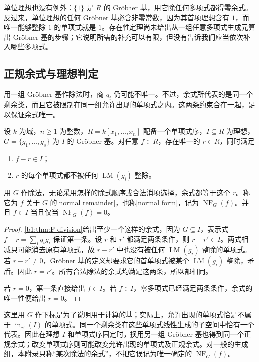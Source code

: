 单位理想也没有例外：\(\{1\}\) 是 \(R\) 的 Gröbner 基，用它除任何多项式都得零余式。反过来，单位理想的任何 Gröbner 基必含非零常数，因为其首项理想含有 \(1\)，而唯一能够整除 \(1\) 的单项式就是 \(1\)。存在性定理尚未给出从一组任意多项式生成元算出 Gröbner 基的步骤；它说明所需的补充可以有限，但没有告诉我们应当依次补入哪些多项式。

\subsection{正规余式与理想判定}
\label{b1:subsec:F02:03}

用一组 Gröbner 基作除法时，商 \(q_i\) 仍可能不唯一。不过，余式所代表的是同一个剩余类，而且它被限制在同一组允许出现的单项式之内。这两条约束合在一起，足以保证余式唯一。

\begin{theorem}[正规式与成员判据]\label{b1:thm:F-normal-form}
	设 \(k\) 为域，\(n\geq1\) 为整数，\(R=k[x_1,\ldots,x_n]\) 配备一个单项式序，\(I\subseteq R\) 为理想，\(G=\{g_1,\ldots,g_s\}\) 为 \(I\) 的 Gröbner 基。对任意 \(f\in R\)，存在唯一的 \(r\in R\)，同时满足
	\begin{enumerate}
		\item \(f-r\in I\)；
		\item \(r\) 的每个单项式都不被任何 \(\operatorname{LM}(g_i)\) 整除。
	\end{enumerate}
	用 \(G\) 作除法，无论采用怎样的除式顺序或合法消项选择，余式都等于这个 \(r\)。称它为 \(f\) 关于 \(G\) 的[normal remainder]，也称[normal form]，记为 \(\operatorname{NF}_G(f)\)。并且 \(f\in I\) 当且仅当 \(\operatorname{NF}_G(f)=0\)。
\end{theorem}
\begin{proof}
	\cref{b1:thm:F-division}给出至少一个这样的余式，因为 \(G\subseteq I\)，表示式 \(f- r=\sum_iq_i g_i\) 保证第一条。设 \(r\) 和 \(r'\) 都满足两条条件，则 \(r-r'\in I\)。两式相减只可能消去原有单项式，故 \(r-r'\) 中也没有被任何 \(\operatorname{LM}(g_i)\) 整除的单项式。若 \(r-r'\ne0\)，Gröbner 基的定义却要求它的首单项式被某个 \(\operatorname{LM}(g_i)\) 整除，矛盾。因此 \(r=r'\)。所有合法除法的余式均满足这两条，所以都相同。

	若 \(r=0\)，第一条直接给出 \(f\in I\)。若 \(f\in I\)，零多项式已经满足两条条件，余式的唯一性便给出 \(r=0\)。
\end{proof}

这里用 \(G\) 作下标是为了说明用于计算的基；实际上，允许出现的单项式恰是不属于 \(\operatorname{in}_{\prec}(I)\) 的单项式。同一个剩余类在这些单项式线性生成的子空间中恰有一个代表。因此在理想 \(I\) 和单项式序固定时，换用另一组 Gröbner 基也得到同一个正规余式；改变单项式序则可能改变允许出现的单项式及正规余式。对一般的生成组，本附录只称“某次除法的余式”，不把它误记为唯一确定的 \(\operatorname{NF}_G(f)\)。


